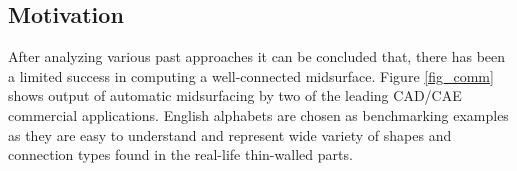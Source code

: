 
\subsection{Motivation}
After analyzing various past approaches it can be concluded that, there has been a limited success in computing a well-connected midsurface. Figure \ref{fig_comm} shows output of automatic midsurfacing by two of the leading CAD/CAE commercial applications. English alphabets are chosen as benchmarking examples as they are easy to understand and represent wide variety of shapes and connection types found in the real-life thin-walled parts.

\def \myfigcommcolumnwidth{0.28}

